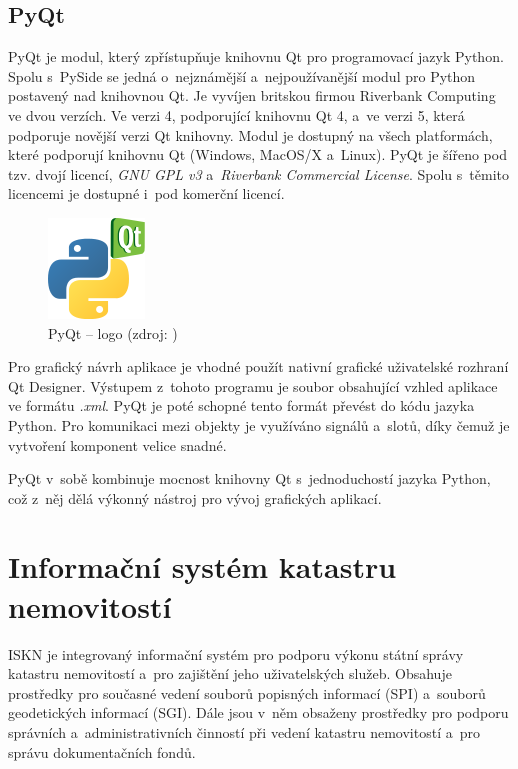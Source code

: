 \documentclass[a4paper,12pt,oneside]{book}
\begin{document}
\newpage
\section{PyQt}

PyQt je modul, který zpřístupňuje knihovnu Qt pro programovací jazyk Python. Spolu s~PySide se jedná o~nejznámější a~nejpoužívanější modul pro Python postavený nad knihovnou Qt. Je vyvíjen britskou firmou Riverbank Computing ve dvou verzích. Ve verzi 4, podporující knihovnu Qt 4, a~ve verzi 5, která podporuje novější verzi Qt knihovny. Modul je dostupný na všech platformách, které podporují knihovnu Qt (Windows, MacOS/X a~Linux). PyQt je šířeno pod tzv. dvojí licencí, \textit{GNU GPL v3} a~\textit{Riverbank Commercial License}. Spolu s~těmito licencemi je dostupné i~pod komerční licencí.

\begin{figure}[htb]
\centering
\includegraphics[scale=1]{images/pyqt-logo.png}
\caption[PyQt -- logo]{PyQt -- logo (zdroj: \cite{pyqt_wiki})}
\end{figure}

Pro grafický návrh aplikace je vhodné použít nativní grafické uživatelské rozhraní Qt Designer. Výstupem z~tohoto programu je soubor obsahující vzhled aplikace ve formátu \textit{.xml}. PyQt je poté schopné tento formát převést do kódu jazyka Python. Pro komunikaci mezi objekty je využíváno signálů a~slotů, díky čemuž je vytvoření komponent velice snadné.

PyQt v~sobě kombinuje mocnost knihovny Qt s~jednoduchostí jazyka Python, což z~něj dělá výkonný nástroj pro vývoj grafických aplikací.
\cite{pyqt}
\cite{pyqt_wiki}


\clearpage
\chapter{Informační systém katastru nemovitostí}
\label{l_iskn}

ISKN je integrovaný informační systém pro podporu výkonu státní správy katastru nemovitostí a~pro zajištění jeho uživatelských služeb. Obsahuje prostředky pro současné vedení souborů popisných informací (SPI) a~souborů geodetických informací (SGI). Dále jsou v~něm obsaženy prostředky pro podporu správních a~administrativních činností při vedení katastru nemovitostí a~pro správu dokumentačních fondů. \cite{iskn}
\end{document}
